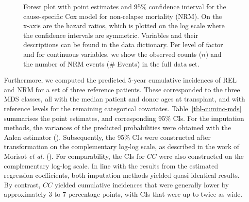 \documentclass[
  letterpaper,
  paper=240mm:170mm,
  twoside=true,
  open=right,
  fontsize=10pt,
  pagesize=false,
  BCOR=15mm,
  DIV=14,
  headinclude=true,
  footinclude=false,
  headsepline=on]{scrbook}
\begin{document}
\begin{figure}


\caption{\label{fig-forest-nrm}Forest plot with point estimates and 95\%
confidence interval for the cause-specific Cox model for non-relapse
mortality (NRM). On the x-axis are the hazard ratios, which is plotted
on the log scale where the confidence intervals are symmetric. Variables
and their descriptions can be found in the data dictionary. Per level of
factor and for continuous variables, we show the observed counts (\(n\))
and the number of NRM events (\# Events) in the full data set.}

\end{figure}%

Furthermore, we computed the predicted 5-year cumulative incidences of
REL and NRM for a set of three reference patients. These corresponded to
the three MDS classes, all with the median patient and donor ages at
transplant, and with reference levels for the remaining categorical
covariates. Table~\ref{tbl-cuminc-mds} summarises the point estimates,
and corresponding 95\% CIs. For the imputation methods, the variances of
the predicted probabilities were obtained with the Aalen estimator
(). Subsequently, the 95\% CIs were constructed after
transformation on the complementary log-log scale, as described in the
work of Morisot \emph{et al.}
(). For comparability,
the CIs for \(CC\) were also constructed on the complementary log-log
scale. In line with the results from the estimated regression
coefficients, both imputation methods yielded quasi identical results.
By contrast, \(CC\) yielded cumulative incidences that were generally
lower by approximately 3 to 7 percentage points, with CIs that were up
to twice as wide.
\end{document}
